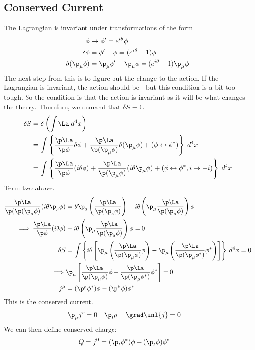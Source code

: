 \documentclass[a4paper, 11pt, normalem]{report}
\begin{document}
\chapter{}
\section{Conserved Current}
The Lagrangian is invariant under transformations of the form
\begin{align}
    \phi &\to \phi' = e^{i\theta}\phi \\
    \delta\phi &= \phi'-\phi = (e^{i\theta}-1)\phi \\
    \delta(\p_\mu\phi) &= \p_\mu\phi' - \p_\mu\phi = (e^{i\theta}-1)\p_\mu\phi
\end{align}
The next step from this is to figure out the change to the action. 
If the Lagrangian is invariant, the action should be - but this condition is a bit too tough. 
So the condition is that the action is invariant as it will be what changes the theory. 
Therefore, we demand that $\delta S = 0$.
\begin{align}
    \delta S &= \delta\left( \int \La\;d^4x\right) \\
             &= \int \left\{ \frac{\p\La}{\p\phi}\delta\phi + \frac{\p\La}{\p(\p_\mu\phi)}\delta(\p_\mu\phi) + (\phi\leftrightarrow\phi^*)\right\}\;d^4x \\
             &= \int \left\{\frac{\p\La}{\p\phi}(i\theta\phi) + \frac{\p\La}{\p(\p_\mu\phi)}(i\theta\p_\mu\phi) + (\phi\leftrightarrow\phi^*,i\to-i)  \right\}\;d^4x
\end{align}
Term two above:
\begin{align}
    \frac{\p\La}{\p(\p(\p_\mu\phi)}(i\theta\p_\mu\phi) &= \theta\p_\mu\left(\frac{\p\La}{\p(\p_\mu\phi)}\right) - i\theta\left(\p_\mu\frac{\p\La}{\p(\p_\mu\phi)}\right)\phi \\
    \implies \frac{\p\La}{\p\phi}(i\theta\phi) &- i\theta\left(\p_\mu\frac{\p\La}{\p(\p_\mu\phi)}\right)\phi = 0 \\
    \delta S &= \int \left\{i\theta\left[\p_\mu\left(\frac{\p\La}{\p(\p_\mu\phi)}\phi\right) - \p_\mu\left(\frac{\p\La}{\p(\p_\mu\phi^*)}\phi^*\right)\right]\right\}\;d^4x = 0 \\
    \implies &\p_\mu\left[\frac{\p\La}{\p(\p_\mu\phi)} \phi - \frac{\p\La}{\p(\p_\mu\phi^*)}\phi^*\right] = 0 \\
    j^\mu &= (\p^\mu\phi^*)\phi - (\p^\mu\phi)\phi^*
\end{align}
This is the conserved current. 
\begin{align}
    \p_\mu j^r &= 0 & \p_t\rho - \grad\unl{j} &= 0 
\end{align}
We can then define conserved charge:
\begin{align}
    Q &= j^0 = (\p_t\phi^*)\phi - (\p_t\phi)\phi^* 
\end{align}
\end{document}
